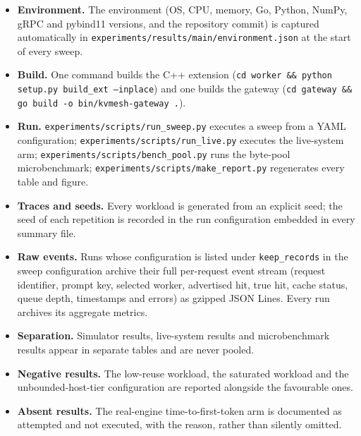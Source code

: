 \documentclass[10pt,twocolumn]{article}
\begin{document}
\begin{itemize}
\item \textbf{Environment.} The environment (OS, CPU, memory, Go, Python, NumPy,
gRPC and pybind11 versions, and the repository commit) is captured
automatically in \texttt{experiments/\allowbreak results/\allowbreak main/\allowbreak environment.json} at the
start of every sweep.
\item \textbf{Build.} One command builds the C++ extension
(\texttt{cd worker \&\& python setup.py build\_ext --inplace}) and one builds
the gateway (\texttt{cd gateway \&\& go build -o bin/\allowbreak kvmesh-gateway .}).
\item \textbf{Run.} \texttt{experiments/\allowbreak scripts/\allowbreak run\_sweep.py} executes a
sweep from a YAML configuration; \texttt{experiments/\allowbreak scripts/\allowbreak run\_live.py}
executes the live-system arm; \texttt{experiments/\allowbreak scripts/\allowbreak bench\_pool.py}
runs the byte-pool microbenchmark; \texttt{experiments/\allowbreak scripts/\allowbreak make\_report.py}
regenerates every table and figure.
\item \textbf{Traces and seeds.} Every workload is generated from an explicit
seed; the seed of each repetition is recorded in the run configuration
embedded in every summary file.
\item \textbf{Raw events.} Runs whose configuration is listed under
\texttt{keep\_records} in the sweep configuration archive their full per-request
event stream (request identifier, prompt key, selected worker, advertised hit,
true hit, cache status, queue depth, timestamps and errors) as gzipped JSON
Lines. Every run archives its aggregate metrics.
\item \textbf{Separation.} Simulator results, live-system results and
microbenchmark results appear in separate tables and are never pooled.
\item \textbf{Negative results.} The low-reuse workload, the saturated
workload and the unbounded-host-tier configuration are reported alongside the
favourable ones.
\item \textbf{Absent results.} The real-engine time-to-first-token arm is
documented as attempted and not executed, with the reason, rather than
silently omitted.
\end{itemize}
\end{document}
